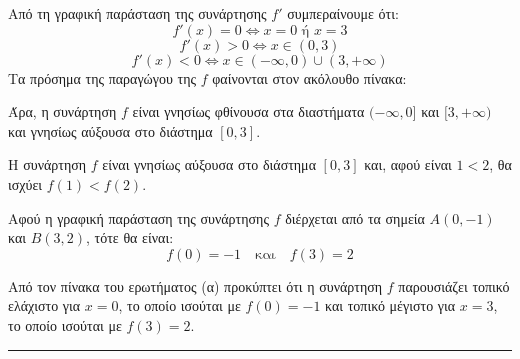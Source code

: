 \begin{alist}
\item Από τη γραφική παράσταση της συνάρτησης $f'$ συμπεραίνουμε ότι:
\[ f'(x) = 0 \Leftrightarrow x = 0 \text{ ή } x = 3 \]
\[ f'(x) > 0 \Leftrightarrow x \in (0,3) \]
\[ f'(x) < 0 \Leftrightarrow x \in (-\infty,0) \cup (3,+\infty) \]
Τα πρόσημα της παραγώγου της $f$ φαίνονται στον ακόλουθο πίνακα:

\begin{center}
\end{center}

Άρα, η συνάρτηση $f$ είναι γνησίως φθίνουσα στα διαστήματα $(-\infty,0]$ και $[3,+\infty)$ και γνησίως αύξουσα στο διάστημα $[0,3]$.

\item Η συνάρτηση $f$ είναι γνησίως αύξουσα στο διάστημα $[0,3]$ και, αφού είναι $1 < 2$, θα ισχύει $f(1) < f(2)$.

\item Αφού η γραφική παράσταση της συνάρτησης $f$ διέρχεται από τα σημεία $A(0,-1)$ και $B(3,2)$, τότε θα είναι:
\[ f(0) = -1 \quad \text{και} \quad f(3) = 2 \]

Από τον πίνακα του ερωτήματος (α) προκύπτει ότι η συνάρτηση $f$ παρουσιάζει τοπικό ελάχιστο για $x = 0$, το οποίο ισούται με $f(0) = -1$ και τοπικό μέγιστο για $x = 3$, το οποίο ισούται με $f(3) = 2$.
\end{alist}
\vspace{6mm}
\noindent\rule{\textwidth}{0.4pt}
\vspace{6mm}

